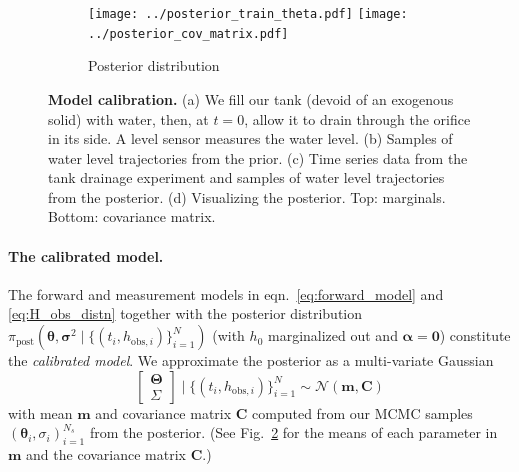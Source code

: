 \documentclass[openacc]{rsproca_new}%
\newcommand\thedatanomath {\{(t_i,h_{\text{obs}, i})\}_{i=1}^{N}}
\begin{document}
\begin{figure}[!ht]
     \begin{subfigure}[b]{\textwidth}
     \center
    	\texttt{[image: ../posterior\_train\_theta.pdf]}
	\texttt{[image: ../posterior\_cov\_matrix.pdf]}
	\caption{Posterior distribution} \label{fig:posterior_train_theta}
    \end{subfigure}
    \caption{
      \textbf{Model calibration.}
      (a) We fill our tank (devoid of an exogenous solid) with water, then, at $t=0$, allow it to drain through the orifice in its side. A level sensor measures the water level.     
      (b) Samples of water level trajectories from the prior.
      (c) Time series data from the tank drainage experiment and samples of water level trajectories from the posterior.
       (d) Visualizing the posterior. Top: marginals. Bottom: covariance matrix.      
      }
\end{figure}

\paragraph{The calibrated model.} The forward and measurement models in eqn.~\ref{eq:forward_model} and \ref{eq:H_obs_distn} together with the posterior distribution $\pi_{\text{post}}(\boldsymbol \theta, \boldsymbol \sigma^2 \mid \thedatanomath)$ (with $h_0$ marginalized out and $\boldsymbol \alpha=\mathbf{0}$) constitute the \emph{calibrated model}.
We approximate the posterior as a multi-variate Gaussian
\begin{equation}
	\begin{bmatrix} \boldsymbol \Theta \\ \Sigma \end{bmatrix} \mid \thedatanomath \sim \mathcal{N}(\mathbf{m}, \mathbf{C}) \label{eq:post_theta_sigma}
\end{equation}
with mean $\mathbf{m}$ and covariance matrix $\mathbf{C}$ computed from our MCMC samples $(\boldsymbol \theta_i, \sigma_i)_{i=1}^{N_s}$ from the posterior. 
(See Fig.~\ref{fig:posterior_train_theta} for the means of each parameter in $\mathbf{m}$ and the covariance matrix $\mathbf{C}$.)
\end{document}
